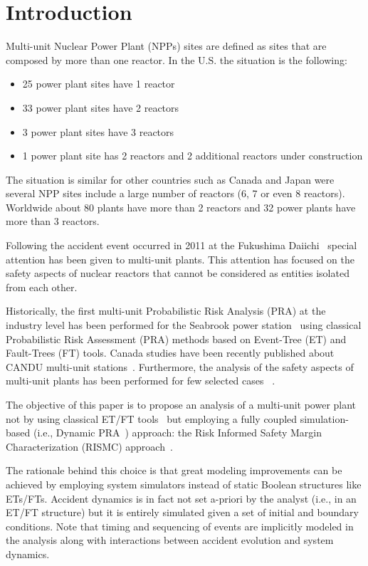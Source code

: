 \section{Introduction}
\label{sec:introduction}

Multi-unit Nuclear Power Plant (NPPs) sites are defined as sites that are composed by 
more than one reactor. In the U.S. the situation is the following:
\begin{itemize}
  \item 25 power plant sites have 1 reactor
  \item 33 power plant sites have 2 reactors
  \item 3 power plant sites have 3 reactors
  \item 1 power plant site has 2 reactors and 2 additional reactors under construction
\end{itemize}
The situation is similar for other countries such as Canada and Japan were 
several NPP sites include a large number of reactors (6, 7 or even 8 reactors). 
Worldwide about 80 plants have more than 2 reactors and 32 power plants have more 
than 3 reactors. 

Following the accident event occurred in 2011 at the Fukushima Daiichi~\cite{Fukushima} special 
attention has been given to multi-unit plants. This attention has focused on the 
safety aspects of nuclear reactors that cannot be considered as entities isolated 
from each other. 

Historically, the first multi-unit Probabilistic Risk Analysis (PRA) at the industry
level has been performed for the Seabrook power station~\cite{Seabrook_MU_PRA} using 
classical Probabilistic Risk Assessment (PRA) methods based on Event-Tree (ET) and 
Fault-Trees (FT) tools.
Canada studies have been recently published about CANDU multi-unit 
stations~\cite{CANDU_MU_PRA,Darlington_MU_PRA}.
Furthermore, the analysis of the safety aspects of multi-unit plants has been performed 
for few selected cases ~\cite{MultiUnitKumara,MultiUnitModarres,MultiUnitZhang}. 

The objective of this paper is to propose an analysis of a multi-unit power 
plant not by using classical ET/FT tools~\cite{Nureg1150} but employing a fully 
coupled simulation-based (i.e., Dynamic PRA~\cite{DynamicReliabilityMonteCarlo}) approach: 
the Risk Informed Safety Margin Characterization (RISMC) approach~\cite{RISMC,mandelliNewAlgo}. 

The rationale behind this choice is that great modeling improvements can be achieved by 
employing system simulators instead of static Boolean structures like ETs/FTs. 
Accident dynamics is in fact not set a-priori by the analyst (i.e., in an ET/FT 
structure) but it is entirely simulated given a set of initial and boundary conditions. 
Note that timing and sequencing of events are implicitly modeled in the analysis along 
with interactions between accident evolution and system dynamics.

